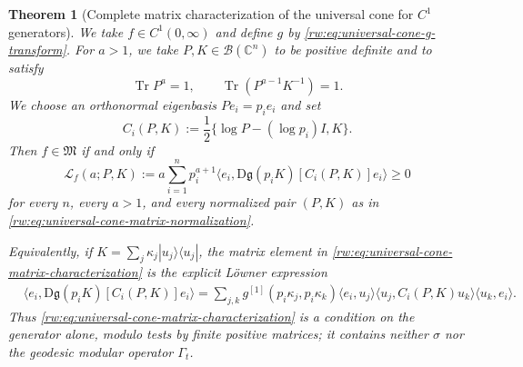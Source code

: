 \documentclass[11pt]{article}
\newtheorem{theorem}[theorem]{Theorem}
\theoremstyle{remark}
\newcommand{\1}{\mathbbm{1}}
\begin{document}
\begin{theorem}[Complete matrix characterization of the universal cone
for $C^1$ generators]
\label{rw:thm:universal-cone-matrix-characterization}
We take \(f\in C^1(0,\infty)\) and define \(g\) by
\eqref{rw:eq:universal-cone-g-transform}.  For \(a>1\), we take
\(P,K\in\mathcal B(\mathbb C^n)\) to be positive definite and to satisfy
\begin{equation}
 \operatorname{Tr}P^a=1,
 \qquad
 \operatorname{Tr}(P^{a-1}K^{-1})=1.
 \label{rw:eq:universal-cone-matrix-normalization}
\end{equation}
We choose an orthonormal eigenbasis \(Pe_i=p_i e_i\) and set
\begin{equation}
 C_i(P,K)
 :=\frac12\Big\{\log P-(\log p_i)I,K\Big\}.
 \label{rw:eq:universal-cone-Ci}
\end{equation}
Then \(f\in\mathfrak M\) if and only if
\begin{equation}
 \boxed{
 \mathcal L_f(a;P,K)
 :=a\sum_{i=1}^n p_i^{a+1}
 \big\langle e_i,
 \mathrm D\mathfrak g(p_iK)[C_i(P,K)]e_i
 \big\rangle
 \geq0
 }
 \label{rw:eq:universal-cone-matrix-characterization}
\end{equation}
for every \(n\), every \(a>1\), and every normalized pair
\((P,K)\) as in
\eqref{rw:eq:universal-cone-matrix-normalization}.

Equivalently, if
\(K=\sum_j\kappa_j|u_j\rangle\langle u_j|\), the matrix element in
\eqref{rw:eq:universal-cone-matrix-characterization} is the explicit
L\"owner expression
\begin{equation}
 \begin{split}
 &\big\langle e_i,
 \mathrm D\mathfrak g(p_iK)[C_i(P,K)]e_i\big\rangle
=\sum_{j,k}
 g^{[1]}(p_i\kappa_j,p_i\kappa_k)
 \langle e_i,u_j\rangle
 \langle u_j,C_i(P,K)u_k\rangle
 \langle u_k,e_i\rangle .
 \end{split}
 \label{rw:eq:universal-cone-Loewner-form}
\end{equation}
Thus \eqref{rw:eq:universal-cone-matrix-characterization} is a
condition on the generator alone, modulo tests by finite positive
matrices; it contains neither \(\sigma\) nor the geodesic modular
operator \(\Gamma_t\).
\end{theorem}
\end{document}
